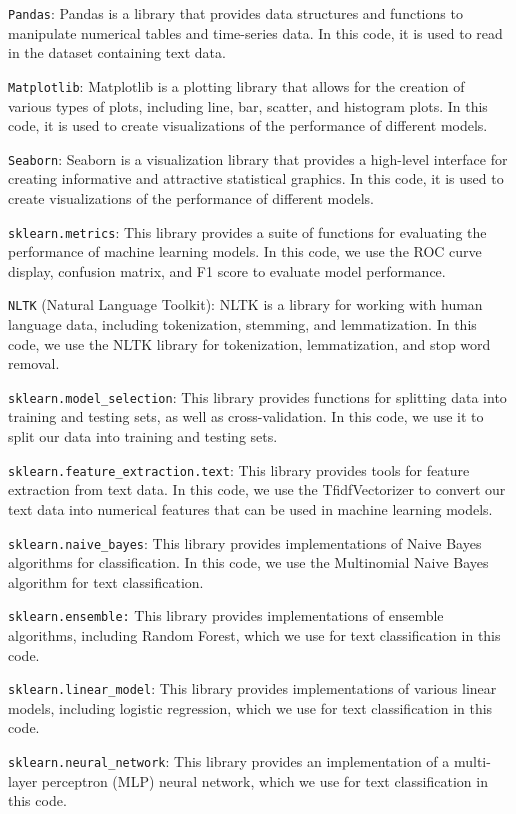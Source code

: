 \documentclass[11pt]{diazessay} %
\begin{document}
\verb|Pandas|: Pandas is a library that provides data structures and functions to manipulate numerical tables and time-series data. In this code, it is used to read in the dataset containing text data.

\verb|Matplotlib|: Matplotlib is a plotting library that allows for the creation of various types of plots, including line, bar, scatter, and histogram plots. In this code, it is used to create visualizations of the performance of different models.

\verb|Seaborn|: Seaborn is a visualization library that provides a high-level interface for creating informative and attractive statistical graphics. In this code, it is used to create visualizations of the performance of different models.

\verb|sklearn.metrics|: This library provides a suite of functions for evaluating the performance of machine learning models. In this code, we use the ROC curve display, confusion matrix, and F1 score to evaluate model performance.

\verb|NLTK| (Natural Language Toolkit): NLTK is a library for working with human language data, including tokenization, stemming, and lemmatization. In this code, we use the NLTK library for tokenization, lemmatization, and stop word removal.

\verb|sklearn.model_selection|: This library provides functions for splitting data into training and testing sets, as well as cross-validation. In this code, we use it to split our data into training and testing sets.

\verb|sklearn.feature_extraction.text|: This library provides tools for feature extraction from text data. In this code, we use the TfidfVectorizer to convert our text data into numerical features that can be used in machine learning models.

\verb|sklearn.naive_bayes|: This library provides implementations of Naive Bayes algorithms for classification. In this code, we use the Multinomial Naive Bayes algorithm for text classification.

\verb|sklearn.ensemble:| This library provides implementations of ensemble algorithms, including Random Forest, which we use for text classification in this code.

\verb|sklearn.linear_model|: This library provides implementations of various linear models, including logistic regression, which we use for text classification in this code.

\verb|sklearn.neural_network|: This library provides an implementation of a multi-layer perceptron (MLP) neural network, which we use for text classification in this code.
\end{document}

